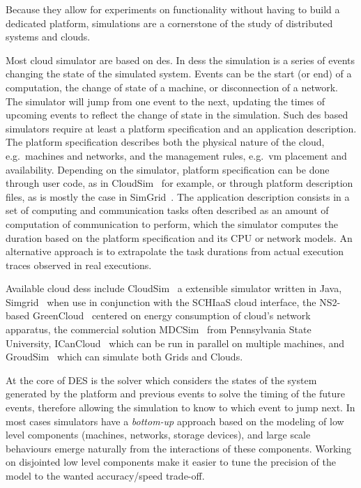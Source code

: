 \documentclass[10pt,conference,compsocconf]{IEEEtran}
\begin{document}
Because they allow for experiments on functionality without having to build a
dedicated platform, simulations are a cornerstone of the study of distributed
systems and clouds.  

Most cloud  simulator are based on  \ac{des}. In \aclp{des} the  simulation is a
series of events changing the state of  the simulated system.  Events can be the
start  (or  end)  of a  computation,  the  change  of  state of  a  machine,  or
disconnection of a network.  The simulator will jump from one event to the next,
updating the  times of  upcoming events to  reflect the change  of state  in the
simulation.   Such  \ac{des}  based  simulators  require  at  least  a  platform
specification  and  an  application  description.   The  platform  specification
describes both the physical nature of the cloud, e.g.~machines and networks, and
the management rules, e.g.~\ac{vm} placement and availability.  Depending on the
simulator,  platform  specification  can  be  done  through  user  code,  as  in
CloudSim~\cite{cloudsim} for example, or  through platform description files, as
is  mostly  the case  in  SimGrid~\cite{simgrid}.   The application  description
consists in  a set of  computing and communication  tasks often described  as an
amount of computation of communication  to perform, which the simulator computes
the duration based on the platform  specification and its CPU or network models.
An  alternative  approach is  to  extrapolate  the  task durations  from  actual
execution traces observed in real executions.

Available cloud \acp{des} include CloudSim~\cite{cloudsim} a extensible
simulator written in Java, Simgrid~\cite{simgrid} when use in conjunction with
the SCHIaaS cloud interface, the NS2-based GreenCloud~\cite{greencloud} centered
on energy consumption of cloud's network apparatus, the commercial solution
MDCSim~\cite{MDCSim} from Pennsylvania State University,
ICanCloud~\cite{icancloud} which can be run in parallel on multiple machines,
and GroudSim~\cite{groudsim} which can simulate both Grids and Clouds.

At  the core  of DES  is the  solver which  considers the  states of  the system
generated by the platform and previous events  to solve the timing of the future
events,  therefore allowing  the  simulation  to know  to  which  event to  jump
next. In  most cases simulators  have a  \emph{bottom-up} approach based  on the
modeling  of low  level components  (machines, networks,  storage devices),  and
large  scale  behaviours  emerge naturally  from  the  interactions  of  these
components. Working  on disjointed low level  components make it easier  to tune
the precision  of the model to  the wanted accuracy/speed trade-off.
\end{document}
